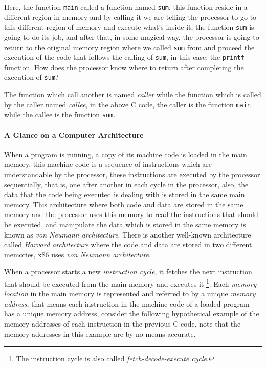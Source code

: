 Here, the function \lstinline!main! called a function named
\lstinline!sum!, this function reside in a different region in memory
and by calling it we are telling the processor to go to this different
region of memory and execute what's inside it, the function
\lstinline!sum! is going to do its job, and after that, in some magical
way, the processor is going to return to the original memory region
where we called \lstinline!sum! from and proceed the execution of the
code that follows the calling of \lstinline!sum!, in this case, the
\lstinline!printf! function. How does the processor know where to return
after completing the execution of \lstinline!sum!?

The function which call another is named \emph{caller} while the
function which is called by the caller named \emph{callee}, in the above
C code, the caller is the function \lstinline!main! while the callee is
the function \lstinline!sum!.

\paragraph{A Glance on a Computer
Architecture}\label{a-glance-on-a-computer-architecture}

When a program is running, a copy of its machine code is loaded in the
main memory, this machine code is a sequence of instructions which are
understandable by the processor, these instructions are executed by the
processor sequentially, that is, one after another in each cycle in the
processor, also, the data that the code being executed is dealing with
is stored in the same main memory. This architecture where both code and
data are stored in the same memory and the processor uses this memory to
read the instructions that should be executed, and manipulate the data
which is stored in the same memory is known as \emph{von Neumann
architecture}. There is another well-known architecture called
\emph{Harvard architecture} where the code and data are stored in two
different memories, x86 uses \emph{von Neumann architecture}.

When a processor starts a new \emph{instruction cycle}, it fetches the
next instruction that should be executed from the main memory and
executes it \footnote{The instruction cycle is also called
  \emph{fetch-decode-execute cycle}.}. Each \emph{memory location} in
the main memory is represented and referred to by a unique \emph{memory
address}, that means each instruction in the machine code of a loaded
program has a unique memory address, consider the following hypothetical
example of the memory addresses of each instruction in the previous C
code, note that the memory addresses in this example are by no means
accurate.

